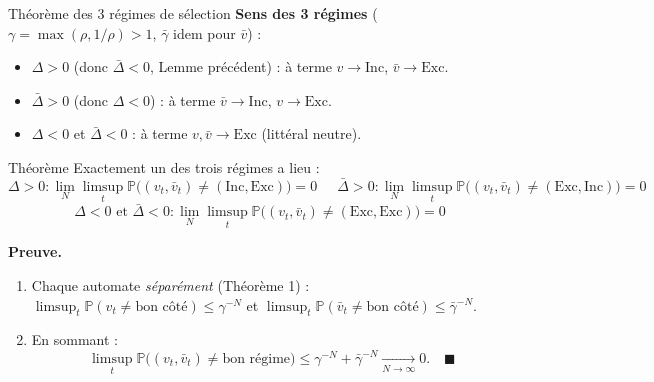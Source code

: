 \documentclass[10pt,aspectratio=169]{beamer}
\newcommand{\Inc}{\ensuremath{\mathrm{Inc}}}
\newcommand{\Exc}{\ensuremath{\mathrm{Exc}}}
\begin{document}
\begin{frame}{Théorème des 3 régimes de sélection}
\footnotesize
\textbf{Sens des 3 régimes} ($\gamma=\max(\rho,1/\rho)>1$, $\bar\gamma$ idem pour $\bar v$) :
\begin{itemize}
  \item $\Delta>0$ (donc $\bar\Delta<0$, Lemme précédent) : à terme $v\to\Inc$, $\bar v\to\Exc$.
  \item $\bar\Delta>0$ (donc $\Delta<0$) : à terme $\bar v\to\Inc$, $v\to\Exc$.
  \item $\Delta<0$ et $\bar\Delta<0$ : à terme $v,\bar v\to\Exc$ (littéral neutre).
\end{itemize}

\begin{block}{Théorème}
\scriptsize
Exactement un des trois régimes a lieu :
\[
  \Delta>0 : \lim_N\limsup_t \mathbb P\bigl((v_t,\bar v_t)\ne(\Inc,\Exc)\bigr)=0 \quad\ \
  \bar\Delta>0 : \lim_N\limsup_t \mathbb P\bigl((v_t,\bar v_t)\ne(\Exc,\Inc)\bigr)=0
\]
\[
  \Delta<0 \text{ et } \bar\Delta<0 : \lim_N\limsup_t \mathbb P\bigl((v_t,\bar v_t)\ne(\Exc,\Exc)\bigr)=0
\]
\end{block}

\textbf{Preuve.}
\begin{enumerate}
  \item Chaque automate \emph{séparément} (Théorème 1) :
  $\limsup_t\mathbb P(v_t\ne\text{bon côté})\le\gamma^{-N}$ et
  $\limsup_t\mathbb P(\bar v_t\ne\text{bon côté})\le\bar\gamma^{-N}$.
  \item En sommant :
  \[
    \limsup_t \mathbb P\bigl((v_t,\bar v_t)\ne\text{bon régime}\bigr)
    \le \gamma^{-N}+\bar\gamma^{-N} \xrightarrow[N\to\infty]{} 0. \quad\blacksquare
  \]
\end{enumerate}
\end{frame}
\end{document}
